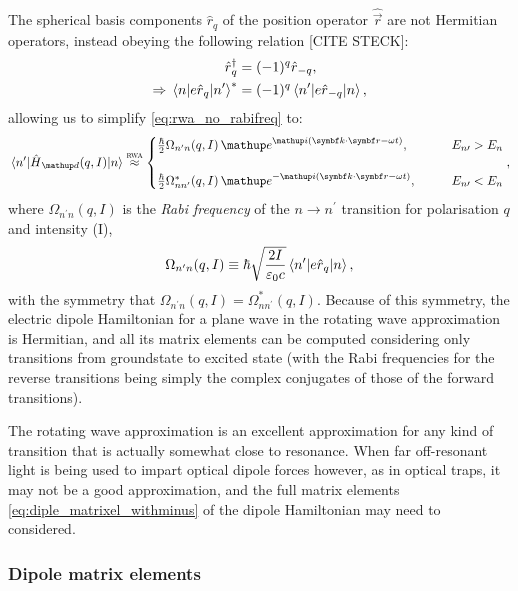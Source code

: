 The spherical basis components $\hat r_q$ of the position operator $\hat{\vec r}$ are not Hermitian operators, instead obeying the following relation [CITE STECK]:
\begin{align}
\hat r_q^\dagger &= (-1)^q \hat r_{-q},\\
\Rightarrow \matrixel{n} {e\hat r_q}{n^\prime}^* &= (-1)^q\matrixel{n^\prime} {e\hat r_{-q}}{n},
\end{align}
allowing us to simplify \eqref{eq:rwa_no_rabifreq} to:
\begin{align}\label{eq:rwa_with_rabifreq}
\matrixel{n^\prime}{\hat H_\up{d}(q,I)}{n} \overset{\textsc{rwa}}\approx
\begin{cases}
\frac\hbar2\Omega_{n^\prime n}(q, I)\,
\ee^{\ii(\vec k \cdot \vec r - \omega t)},\qquad &E_{n\prime} > E_n\\
\\
\frac\hbar2\Omega^*_{n n^\prime}(q, I)\,
\ee^{-\ii(\vec k \cdot \vec r - \omega t)},\qquad &E_{n\prime} < E_n
\end{cases},
\end{align}
where $\Omega_{n^\prime n}(q, I)$ is the \emph{Rabi frequency} of the $n\rightarrow n^\prime$ transition for polarisation $q$ and intensity (I),
\begin{align}
\Omega_{n^\prime n}(q, I) \equiv \hbar\sqrt{\frac{2I}{\varepsilon_0 c}}
\matrixel{n^\prime}{e\hat r_q}{n},
\end{align}
with the symmetry that $\Omega_{n^\prime n}(q, I) = \Omega^*_{n n^\prime}(q, I)$. Because of this symmetry, the electric dipole Hamiltonian for a plane wave in the rotating wave approximation is Hermitian, and all its matrix elements can be computed considering only transitions from groundstate to excited state (with the Rabi frequencies for the reverse transitions being simply the complex conjugates of those of the forward transitions).

The rotating wave approximation is an excellent approximation for any kind of transition that is actually somewhat close to resonance. When far off-resonant light is being used to impart optical dipole forces however, as in optical traps, it may not be a good approximation, and the full matrix elements \eqref{eq:diple_matrixel_withminus} of the dipole Hamiltonian may need to considered.

\subsubsection{Dipole matrix elements}

